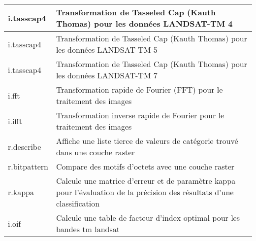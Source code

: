 \begin{table}[ht]
\begin{tabular}{|p{4cm}|p{12cm}|}
  \hline i.tasscap4 & Transformation de Tasseled Cap (Kauth Thomas) pour les donn\'ees LANDSAT-TM 4 \\
  \hline i.tasscap4 & Transformation de Tasseled Cap (Kauth Thomas) pour les donn\'ees LANDSAT-TM 5 \\
  \hline i.tasscap4 & Transformation de Tasseled Cap (Kauth Thomas) pour les donn\'ees LANDSAT-TM 7 \\
  \hline i.fft & Transformation rapide de Fourier (FFT) pour le traitement des images \\
  \hline i.ifft & Transformation inverse rapide de Fourier pour le traitement des images \\
  \hline r.describe & Affiche une liste tierce de valeurs de cat\'egorie trouv\'e dans une couche raster\\
  \hline r.bitpattern & Compare des motifs d'octets avec une couche raster\\
  \hline r.kappa & Calcule une matrice d'erreur et de param\`etre kappa pour l'\'evaluation de la pr\'ecision des r\'esultats d'une classification \\
  \hline i.oif & Calcule une table de facteur d'index optimal pour les bandes tm landsat \\
\hline
\end{tabular}
\end{table}

\clearpage

